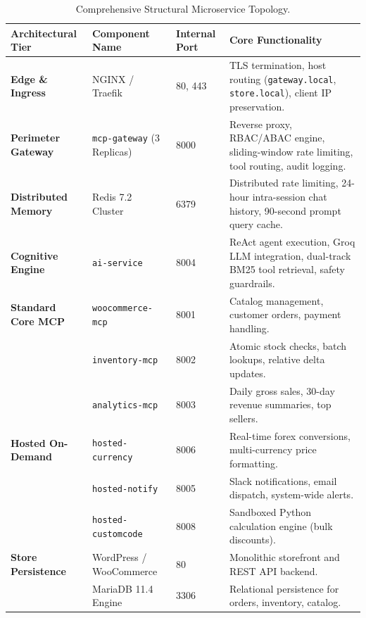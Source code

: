 \documentclass[11pt,a4paper]{article}
\begin{document}
\begin{table}[h!]
\centering
\small
\begin{tabularx}{\textwidth}{p{3.2cm} p{2.8cm} p{2.5cm} X}
\toprule
\textbf{Architectural Tier} & \textbf{Component Name} & \textbf{Internal Port} & \textbf{Core Functionality} \\
\midrule
\textbf{Edge \& Ingress} & NGINX / Traefik & 80, 443 & TLS termination, host routing (\texttt{gateway.local}, \texttt{store.local}), client IP preservation. \\
\addlinespace
\textbf{Perimeter Gateway} & \texttt{mcp-gateway} (3 Replicas) & 8000 & Reverse proxy, RBAC/ABAC engine, sliding-window rate limiting, tool routing, audit logging. \\
\addlinespace
\textbf{Distributed Memory} & Redis 7.2 Cluster & 6379 & Distributed rate limiting, 24-hour intra-session chat history, 90-second prompt query cache. \\
\addlinespace
\textbf{Cognitive Engine} & \texttt{ai-service} & 8004 & ReAct agent execution, Groq LLM integration, dual-track BM25 tool retrieval, safety guardrails. \\
\addlinespace
\textbf{Standard Core MCP} & \texttt{woocommerce-mcp} & 8001 & Catalog management, customer orders, payment handling. \\
                           & \texttt{inventory-mcp}   & 8002 & Atomic stock checks, batch lookups, relative delta updates. \\
                           & \texttt{analytics-mcp}   & 8003 & Daily gross sales, 30-day revenue summaries, top sellers. \\
\addlinespace
\textbf{Hosted On-Demand}  & \texttt{hosted-currency}  & 8006 & Real-time forex conversions, multi-currency price formatting. \\
                           & \texttt{hosted-notify}    & 8005 & Slack notifications, email dispatch, system-wide alerts. \\
                           & \texttt{hosted-customcode}& 8008 & Sandboxed Python calculation engine (bulk discounts). \\
\addlinespace
\textbf{Store Persistence}& WordPress / WooCommerce & 80 & Monolithic storefront and REST API backend. \\
                           & MariaDB 11.4 Engine      & 3306 & Relational persistence for orders, inventory, catalog. \\
\bottomrule
\end{tabularx}
\caption{Comprehensive Structural Microservice Topology.}
\label{tab:architecture_topology}
\end{table}
\end{document}
